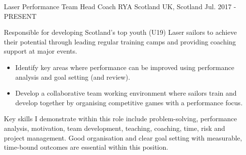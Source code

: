 \begin{cventries}

\end{cventries}





\begin{cventries}

  \cventry
    {Laser Performance Team Head Coach} %
    {RYA Scotland} %
    {UK, Scotland} %
    {Jul. 2017 - PRESENT} %
    {
      Responsible for developing Scotland’s top youth (U19) Laser sailors to achieve their potential through leading regular training camps and providing coaching support at major events. 
      \begin{itemize}
          \item Identify key areas where performance can be improved using performance analysis and goal setting (and review).
          \item Develop a collaborative team working environment where sailors train and develop together by organising competitive games with a performance focus.
      \end{itemize}
      Key skills I demonstrate within this role include problem-solving, performance analysis, motivation, team development, teaching, coaching, time, risk and project management. Good organisation and clear goal setting with measurable, time-bound outcomes are essential within this position.
      }


\end{cventries}
